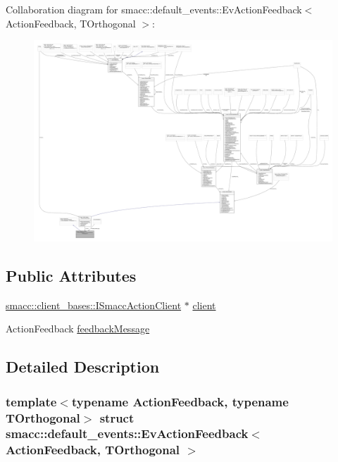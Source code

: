Collaboration diagram for smacc\+:\+:default\+\_\+events\+:\+:Ev\+Action\+Feedback$<$ Action\+Feedback, T\+Orthogonal $>$\+:
\nopagebreak
\begin{figure}[H]
\begin{center}
\leavevmode
\includegraphics[width=350pt]{structsmacc_1_1default__events_1_1EvActionFeedback__coll__graph}
\end{center}
\end{figure}
\subsection*{Public Attributes}
\begin{DoxyCompactItemize}
\item 
\hyperlink{classsmacc_1_1client__bases_1_1ISmaccActionClient}{smacc\+::client\+\_\+bases\+::\+I\+Smacc\+Action\+Client} $\ast$ \hyperlink{structsmacc_1_1default__events_1_1EvActionFeedback_ab8b19361505d9bbf3fd7a9fbd89f6194}{client}
\item 
Action\+Feedback \hyperlink{structsmacc_1_1default__events_1_1EvActionFeedback_ac66d20a4452379d02e5ef6674d7b2f72}{feedback\+Message}
\end{DoxyCompactItemize}


\subsection{Detailed Description}
\subsubsection*{template$<$typename Action\+Feedback, typename T\+Orthogonal$>$\newline
struct smacc\+::default\+\_\+events\+::\+Ev\+Action\+Feedback$<$ Action\+Feedback, T\+Orthogonal $>$}



